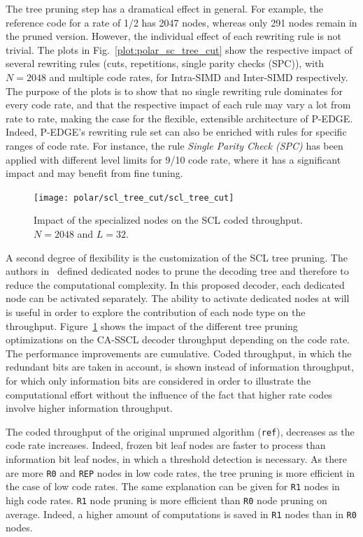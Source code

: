 The tree pruning step has a dramatical effect in general. For example, the
reference code for a rate of 1/2 has 2047 nodes, whereas only 291 nodes remain
in the pruned version. However, the individual effect of each rewriting rule is
not trivial. The plots in Fig.~\ref{plot:polar_sc_tree_cut} show the respective
impact of several rewriting rules (cuts, repetitions, single parity checks
(SPC)), with $N = 2048$ and multiple code rates, for Intra-SIMD and Inter-SIMD
respectively. The purpose of the plots is to show that no single rewriting rule
dominates for every code rate, and that the respective impact of each rule may
vary a lot from rate to rate, making the case for the flexible, extensible
architecture of P-EDGE. Indeed, P-EDGE's rewriting rule set can also be enriched
with rules for specific ranges of code rate. For instance, the rule
\emph{Single Parity Check (SPC)} has been applied with different level limits
for 9/10 code rate, where it has a significant impact and may benefit from fine
tuning.

\begin{figure}
  \centering
  \texttt{[image: polar/scl\_tree\_cut/scl\_tree\_cut]}
  \caption{Impact of the specialized nodes on the SCL coded throughput.
    $N=2048$ and $L=32$.}
  \label{plot:polar_scl_tree_cut}
\end{figure}

A second degree of flexibility is the customization of the SCL tree pruning. The
authors in~\cite{Alamdar-Yazdi2011,Sarkis2016} defined dedicated nodes to prune
the decoding tree and therefore to reduce the computational complexity. In this
proposed decoder, each dedicated node can be activated separately. The ability
to activate dedicated nodes at will is useful in order to explore the
contribution of each node type on the throughput.
Figure~\ref{plot:polar_scl_tree_cut} shows the impact of the different tree
pruning optimizations on the CA-SSCL decoder throughput depending on the code
rate. The performance improvements are cumulative. Coded throughput, in which
the redundant bits are taken in account, is shown instead of information
throughput, for which only information bits are considered in order to
illustrate the computational effort without the influence of the fact that
higher rate codes involve higher information throughput.

The coded throughput of the original unpruned algorithm (\texttt{ref}),
decreases as the code rate increases. Indeed, frozen bit leaf nodes are faster
to process than information bit leaf nodes, in which a threshold detection is
necessary. As there are more \texttt{R0} and \texttt{REP} nodes in low code
rates, the tree pruning is more efficient in the case of low code rates. The
same explanation can be given for \texttt{R1} nodes in high code rates.
\texttt{R1} node pruning is more efficient than \texttt{R0} node pruning on
average. Indeed, a higher amount of computations is saved in \texttt{R1} nodes
than in \texttt{R0} nodes.

